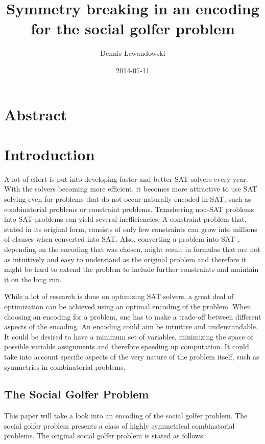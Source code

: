 \documentclass[a4paper]{scrartcl}
\title{Symmetry breaking in an encoding for the social golfer problem}
\author{Dennis Lewandowski}
\date{2014-07-11}
\begin{document}
\maketitle

\section{Abstract}

\section{Introduction}

A lot of effort is put into developing faster and better SAT solvers every year. With the solvers becoming more efficient, it becomes more attractive to use SAT solving even for problems that do not occur naturally encoded in SAT, such as combinatorial problems or constraint problems. Transferring non-SAT problems into SAT-problems can yield several inefficiencies. A constraint problem that, stated in its original form, consists of only few constraints can grow into millions of clauses when converted into SAT. Also, converting a problem into SAT , depending on the encoding that was chosen, might result in formulas that are not as intuitively and easy to understand as the original problem and therefore it might be hard to extend the problem to include further constraints and maintain it on the long run.

While a lot of research is done on optimizing SAT solvers, a great deal of optimization can be achieved using an optimal encoding of the problem. When choosing an encoding for a problem, one has to make a trade-off between different aspects of the encoding. An encoding could aim be intuitive and understandable. It could be desired to have a minimum set of variables, minimizing the space of possible variable assignments and therefore speeding up computation. It could take into account specific aspects of the very nature of the problem itself, such as symmetries in combinatorial problems.

\subsection{The Social Golfer Problem}

This paper will take a look into an encoding of the social golfer problem. The social golfer problem presents a class of highly symmetrical combinatorial problems. The original social golfer problem is stated as follows:
\end{document}
